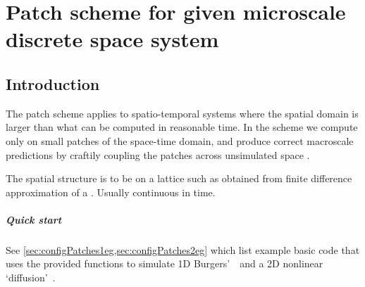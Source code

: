 \chapter{Patch scheme for given microscale discrete space system}
\label{sec:patch}
\localtableofcontents

\section{Introduction}


The patch scheme applies to spatio-temporal systems where
the spatial domain is larger than what can be computed in
reasonable time.  In the scheme we compute only on small patches
of the space-time domain, and produce correct macroscale
predictions by craftily coupling the patches across
unsimulated space \cite[e.g.]{Hyman2005, Samaey03b,
Samaey04, Roberts06d, Liu2015}.

The spatial structure is to be on a lattice such as obtained
from finite difference approximation of a \pde. Usually
continuous in time.

\paragraph{Quick start}
See \cref{sec:configPatches1eg,sec:configPatches2eg} which
list example basic code that uses the provided functions to
simulate 1D Burgers'~\pde\ and a 2D nonlinear
`diffusion'~\pde.




\begin{devMan}




\end{devMan}

